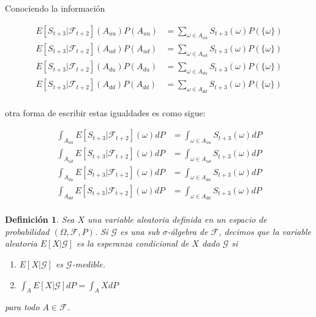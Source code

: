 \documentclass{extreport}
\theoremstyle{definicion}
\newtheorem{definition}{Definición}[chapter]
\theoremstyle{propiedad}
\theoremstyle{teorema}
\begin{document}
Conociendo la información


\begin{align*}
E\left[S_{t+3}\vert \mathcal{F}_{t+2}\right](A_{uu})P(A_{uu}) & = \sum_{\omega \in A_{uu}}S_{t+3}(\omega)P(\{\omega\})\\
E\left[S_{t+3}\vert \mathcal{F}_{t+2}\right](A_{ud})P(A_{ud}) & = \sum_{\omega \in A_{ud}}S_{t+3}(\omega)P(\{\omega\})\\
E\left[S_{t+3}\vert \mathcal{F}_{t+2}\right](A_{du})P(A_{du}) & = \sum_{\omega \in A_{du}}S_{t+3}(\omega)P(\{\omega\})\\
E\left[S_{t+3}\vert \mathcal{F}_{t+2}\right](A_{dd})P(A_{dd}) & = \sum_{\omega \in A_{dd}}S_{t+3}(\omega)P(\{\omega\})\\
\end{align*}


otra forma de escribir estas igualdades es como sigue:


\begin{align*}
\int_{A_{uu}}E\left[S_{t+3}\vert \mathcal{F}_{t+2}\right](\omega)dP & = \int_{\omega \in A_{uu}}S_{t+3}(\omega)dP\\
\int_{A_{ud}}E\left[S_{t+3}\vert \mathcal{F}_{t+2}\right](\omega)dP & = \int_{\omega \in A_{ud}}S_{t+3}(\omega)dP\\
\int_{A_{du}}E\left[S_{t+3}\vert \mathcal{F}_{t+2}\right](\omega)dP & = \int_{\omega \in A_{du}}S_{t+3}(\omega)dP\\
\int_{A_{dd}}E\left[S_{t+3}\vert \mathcal{F}_{t+2}\right](\omega)dP & = \int_{\omega \in A_{dd}}S_{t+3}(\omega)dP\\
\end{align*}

\begin{definition}
Sea $X$ una variable aleatoria definida en un espacio de probabilidad $(\Omega, \mathcal{F}, P)$. Si $\mathcal{G}$ es una sub $\sigma$-álgebra de $\mathcal{F}$, decimos que la variable aleatoria $E\left[X\vert\mathcal{G}\right]$ es la \emph{esperanza condicional} de $X$ dado $\mathcal{G}$ si
\begin{enumerate}
    \item $E\left[X\vert \mathcal{G}\right]$ es $\mathcal{G}$-medible.
    \item $\int_A E\left[X\vert \mathcal{G}\right]dP = \int_A X dP$
\end{enumerate}
para todo $A\in \mathcal{F}$.    
\end{definition}
\end{document}
